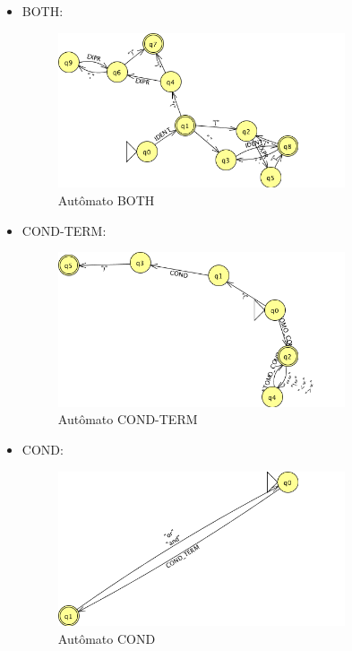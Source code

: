 \begin{itemize}
	\item BOTH:
	\begin{figure}[H]
		\centering 
		\includegraphics[width=0.8\textwidth]{images/submaquinas/BOTH.png}  
		\caption{Autômato BOTH}
	\end{figure}
	
	\item COND-TERM:
	\begin{figure}[H]
		\centering 
		\includegraphics[width=0.8\textwidth]{images/submaquinas/COND-TERM.png}  
		\caption{Autômato COND-TERM}
	\end{figure}
	
	\item COND:
	\begin{figure}[H]
		\centering 
		\includegraphics[width=0.8\textwidth]{images/submaquinas/COND.png}  
		\caption{Autômato COND}
	\end{figure}
	

\end{itemize}
